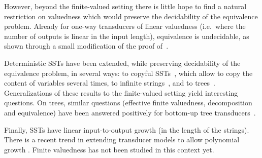 \documentclass{article}
\begin{document}
However, beyond the finite-valued setting there is little hope to 
find a natural restriction on valuedness which would preserve 
the decidability of the equivalence problem. Already for 
one-way transducers of linear valuedness (i.e.~where the number 
of outputs is linear in the input length), equivalence is
undecidable, as shown through a small modification of the 
proof of~\cite{iba78siam}. 


Deterministic SSTs have been extended,
while preserving decidability of the equivalence problem,
in several ways:
to copyful SSTs~\cite{DBLP:journals/siglog/Bojanczyk19a,DBLP:journals/fuin/FiliotR21},
which allow to copy the content of variables several times, 
to infinite strings~\cite{DBLP:conf/lics/AlurFT12}, and to
trees~\cite{DBLP:journals/jacm/AlurD17}. 
Generalizations of these results to the finite-valued setting 
yield interesting questions. On trees, similar questions 
(effective finite valuedness, decomposition and equivalence) 
have been answered positively for bottom-up tree
transducers~\cite{DBLP:journals/mst/Seidl94}.


Finally, SSTs have linear input-to-output growth (in the length of the
strings). There is a recent trend in extending transducer models 
to allow polynomial growth
\cite{DBLP:conf/icalp/BojanczykKL19,DBLP:conf/lics/Bojanczyk22,DBLP:conf/lics/Bojanczyk23a,GaetanPhD}.
Finite valuedness has not  been studied in this context yet.


    

% 
% 
\end{document}

